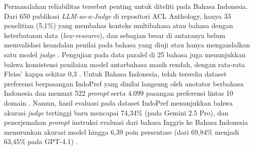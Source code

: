Permasalahan reliabilitas tersebut penting untuk diteliti pada Bahasa Indonesia. Dari 650 publikasi \textit{LLM-as-a-Judge} di repositori ACL Anthology, hanya 33 penelitian (5,1\%) yang membahas konteks multibahasa atau bahasa dengan keterbatasan data (\textit{low-resource}), dan sebagian besar di antaranya belum memvalidasi keandalan penilai pada bahasa yang diuji atau hanya mengandalkan satu model \textit{judge} \cite{dogruozChallengesRecommendationsLLMasaJudge2026}. Pengujian pada data paralel di 25 bahasa juga menunjukkan bahwa konsistensi penilaian model antarbahasa masih rendah, dengan rata-rata Fleiss' kappa sekitar 0,3 \cite{fuHowReliableMultilingual2025}. Untuk Bahasa Indonesia, telah tersedia dataset preferensi berpasangan IndoPref yang dinilai langsung oleh anotator berbahasa Indonesia dan memuat 522 \textit{prompt} serta 4.099 pasangan preferensi lintas 10 domain \cite{wiyonoIndoPrefMultiDomainPairwise2025}. Namun, hasil evaluasi pada dataset IndoPref menunjukkan bahwa akurasi \textit{judge} tertinggi baru mencapai 74,34\% (pada Gemini 2.5 Pro), dan penerjemahan \textit{prompt} instruksi evaluasi dari bahasa Inggris ke Bahasa Indonesia menurunkan akurasi model hingga 6,39 poin persentase (dari 69,84\% menjadi 63,45\% pada GPT-4.1) \cite{wiyonoIndoPrefMultiDomainPairwise2025}.

